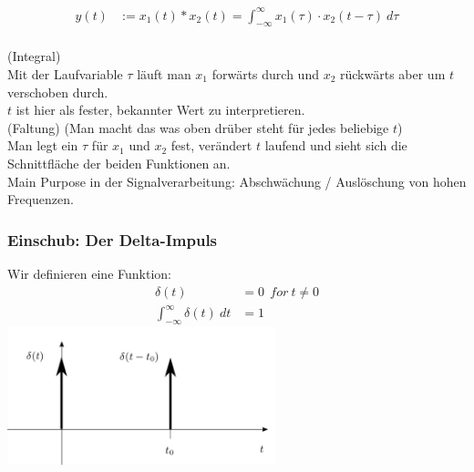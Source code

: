 \documentclass[12pt,a4paper]{scrartcl}
\begin{document}
  \begin{equation}
    \label{eq:7}
      \begin{split}
      y(t) &:= x_1 (t) * x_2 (t) = \int_{-\infty}^{\infty} x_1 (\tau) \cdot x_2 (t-\tau)\ d \tau \\
      \end{split}
    \end{equation}
  
    \noindent (Integral)\\
    \noindent Mit der Laufvariable $\tau$ läuft man $x_1$ forwärts durch und $x_2$ rückwärts aber um $t$ verschoben durch. \\
    $t$ ist hier als fester, bekannter Wert zu interpretieren. \\

    \noindent(Faltung) (Man macht das was oben drüber steht für jedes beliebige $t$)\\
    \noindent Man legt ein $\tau$ für $x_1$ und $x_2$ fest, verändert $t$ laufend und sieht sich die Schnittfläche der beiden Funktionen an. \\

    \noindent Main Purpose in der Signalverarbeitung: Abschwächung / Auslöschung von hohen Frequenzen.

  \subsubsection{Einschub: Der Delta-Impuls}
  \label{sec:sub:sub:delta-impuls}

  \noindent Wir definieren eine Funktion:
  \begin{equation}
    \label{eq:8}
    \begin{split}
    \delta (t) &= 0\ \ for\ t \neq 0 \\    
    \int_{-\infty}^{\infty} \delta (t)\ d t &= 1
    \end{split}
    \end{equation}
  \includegraphics[height=4cm]{Pictures/DeltaImpuls.png} \\
\end{document}
